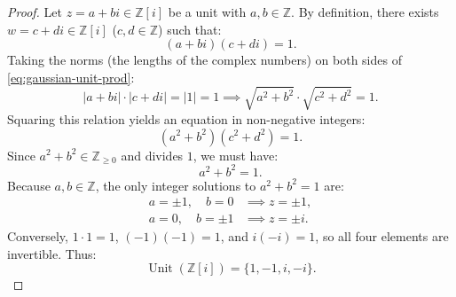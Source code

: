 \begin{content}



\begin{proof}
Let $z = a + bi \in \mathbb{Z}[i]$ be a unit with $a, b \in \mathbb{Z}$. By definition, there exists $w = c + di \in \mathbb{Z}[i]$ ($c, d \in \mathbb{Z}$) such that:
\begin{equation}\label{eq:gaussian-unit-prod}
(a + bi)(c + di) = 1.
\end{equation}
Taking the norms (the lengths of the complex numbers) on both sides of \eqref{eq:gaussian-unit-prod}:
\[
|a + bi| \cdot |c + di| = |1| = 1 \implies \sqrt{a^2 + b^2} \cdot \sqrt{c^2 + d^2} = 1.
\]
Squaring this relation yields an equation in non-negative integers:
\begin{equation}\label{eq:norm-mult-equation}
(a^2 + b^2)(c^2 + d^2) = 1.
\end{equation}
Since $a^2 + b^2 \in \mathbb{Z}_{\ge 0}$ and divides $1$, we must have:
\[
a^2 + b^2 = 1.
\]
Because $a, b \in \mathbb{Z}$, the only integer solutions to $a^2 + b^2 = 1$ are:
\begin{align*}
a = \pm 1, \quad b = 0 &\implies z = \pm 1, \\
a = 0, \quad b = \pm 1 &\implies z = \pm i.
\end{align*}
Conversely, $1 \cdot 1 = 1$, $(-1)(-1) = 1$, and $i(-i) = 1$, so all four elements are invertible. Thus:
\[
\operatorname{Unit}(\mathbb{Z}[i]) = \{1, -1, i, -i\}.
\]
\end{proof}


\end{content}
